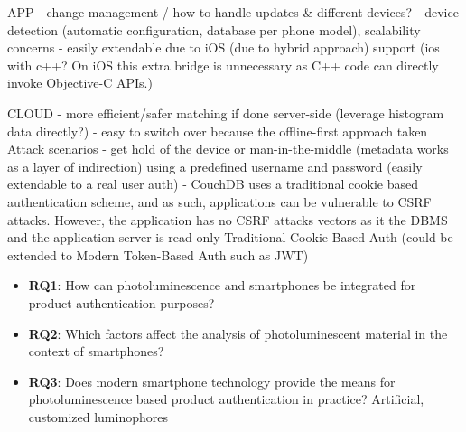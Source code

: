 \documentclass[thesis.tex]{subfiles}
\begin{document}
APP
- change management / how to handle updates \& different devices?
- device detection (automatic configuration, database per phone model), scalability concerns
- easily extendable due to iOS (due to hybrid approach) support (ios with c++? On iOS this extra bridge is unnecessary as C++ code can directly invoke Objective-C APIs.)

CLOUD
- more efficient/safer matching if done server-side (leverage histogram data directly?)
  - easy to switch over because the offline-first approach taken
Attack scenarios
- get hold of the device or man-in-the-middle (metadata works as a layer of indirection)
using a predefined username and password (easily extendable to a real user auth)
- CouchDB uses a traditional cookie based authentication scheme, and as such, applications can be vulnerable to CSRF attacks. However, the application has no CSRF attacks vectors as it the DBMS and the application server is read-only
Traditional Cookie-Based Auth (could be extended to Modern Token-Based Auth such as JWT)


\begin{itemize}
  \item \label{RQ1} \textbf{RQ1}: How can photoluminescence and smartphones be integrated for product authentication purposes?
  \item \label{RQ2} \textbf{RQ2}: Which factors affect the analysis of photoluminescent material in the context of smartphones?
  \item \label{RQ3} \textbf{RQ3}: Does modern smartphone technology provide the means for photoluminescence based product authentication in practice?
    Artificial, customized luminophores
\end{itemize}
\end{document}
